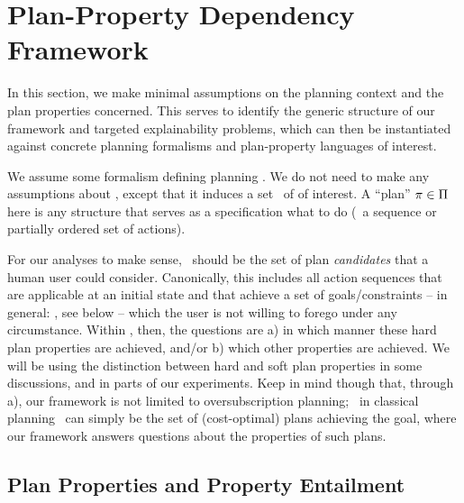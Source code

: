 \section{Plan-Property Dependency Framework}

In this section, we make minimal assumptions on the planning context
and the plan properties concerned. This serves to identify the generic
structure of our framework and targeted explainability problems, which
can then be instantiated against concrete planning formalisms and
plan-property languages of interest.

We assume some formalism defining planning  \task. We
do not need to make any assumptions about \task, except that it
induces a set \plans\ of  of interest. A ``plan''
$\pi \in \Pi$ here is any structure that serves as a
specification what to do (\eg\ a sequence or partially ordered set of
actions).
%
%

For our analyses to make sense, \plans\ should be the set of plan
\emph{candidates} that a human user could consider. Canonically, this
includes all action sequences that are applicable at an initial state
and that achieve a set of  goals/constraints -- in
general: , see below -- which the user is not
willing to forego under any circumstance. Within \plans, then, the
questions are a) in which manner these hard plan properties are
achieved, and/or b) which other  properties are
achieved. We will be using the distinction between hard and soft plan
properties in some discussions, and in parts of our experiments. Keep
in mind though that, through a), our framework is not limited to
oversubscription planning; \eg\ in classical planning \plans\ can
simply be the set of (cost-optimal) plans achieving the goal, where
our framework answers questions about the properties of such plans.



\subsection{Plan Properties and Property Entailment}

